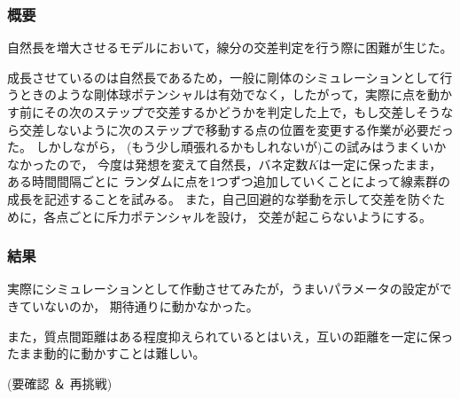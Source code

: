 \subsubsection{概要}

自然長を増大させるモデルにおいて，線分の交差判定を行う際に困難が生じた。

成長させているのは自然長であるため，一般に剛体のシミュレーションとして行うときのような剛体球ポテンシャルは有効でなく，したがって，実際に点を動かす前にその次のステップで交差するかどうかを判定した上で，もし交差しそうなら交差しないように次のステップで移動する点の位置を変更する作業が必要だった。
しかしながら， (もう少し頑張れるかもしれないが)この試みはうまくいかなかったので，
今度は発想を変えて自然長，バネ定数$K$は一定に保ったまま，ある時間間隔ごとに
ランダムに点を1つずつ追加していくことによって線素群の成長を記述することを試みる。
また，自己回避的な挙動を示して交差を防ぐために，各点ごとに斥力ポテンシャルを設け，
交差が起こらないようにする。

\subsubsection{結果}

実際にシミュレーションとして作動させてみたが，うまいパラメータの設定ができていないのか，
期待通りに動かなかった。

また，質点間距離はある程度抑えられているとはいえ，互いの距離を一定に保ったまま動的に動かすことは難しい。

(要確認 ＆ 再挑戦)
